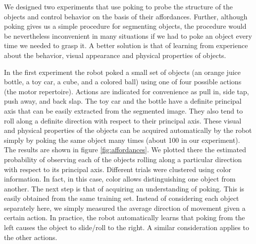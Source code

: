 We designed two experiments that use poking to probe 
the structure of the objects and control behavior on the basis of
their affordances. Further, although poking gives us a simple 
procedure for segmenting objects, the procedure would be 
nevertheless inconvenient in many situations if we had to poke an 
object every time we needed to grasp it. A better solution is that 
of learning from experience about the behavior, visual appearance and 
physical properties of objects.

In the first experiment the robot poked a small set of objects 
(an orange juice bottle, a toy car, a cube, and a colored ball) using 
one of four possible actions (the motor repertoire). Actions are 
indicated for convenience as pull in, side tap, push away, and back 
slap. The toy car and the bottle have a definite principal axis that 
can be easily extracted from the segmented image. They also tend to 
roll along a definite direction with respect to their principal axis. 
These visual and physical properties of the objects can be acquired 
automatically by the robot simply by poking the same object many times 
(about 100 in our experiment). The results are shown in figure 
\ref{fig:affordances}. We plotted there the estimated probability 
of observing each of the objects rolling along a particular direction 
with respect to its principal axis. Different trials were clustered 
using color information. In fact, in this case, color allows 
distinguishing one object from another. The next step is that of 
acquiring an understanding of poking. This is easily obtained from 
the same training set. Instead of considering each object separately 
here, we simply measured the average direction of movement given a 
certain action. In practice, the robot automatically learns that 
poking from the left causes the object to slide/roll to the right. 
A similar consideration applies to the other actions.

